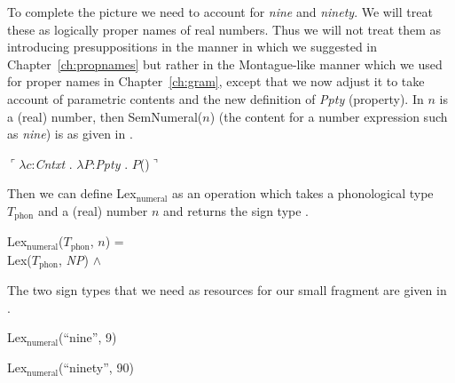 To complete the picture we need to account for \textit{nine} and
\textit{ninety}.  We will treat these as logically proper names of
real numbers.  Thus we will not treat them as introducing
presuppositions in the manner in which we suggested in
Chapter~\ref{ch:propnames} but rather in the Montague-like manner
which we used for proper names in Chapter~\ref{ch:gram}, except that
we now adjust it to take account of parametric contents and the new
definition of \textit{Ppty} (property).
In $n$ is a (real) number, then SemNumeral($n$) (the content for a
number expression such as \textit{nine}) is as given in
\nexteg{}.
\begin{ex} 
$\ulcorner\lambda c$:\textit{Cntxt} . $\lambda P$:\textit{Ppty} . $P$()$\urcorner$ 
\end{ex} 
Then we can define Lex$_{\mathrm{numeral}}$ as an operation which
takes a phonological type $T_{\mathrm{phon}}$ and a (real) number $n$
and returns the sign type \nexteg{}.
\begin{ex} 
Lex$_{\mathrm{numeral}}$($T_{\mathrm{phon}}$, $n$) = \\
\hspace*{1em}Lex($T_{\mathrm{phon}}$, \textit{NP}) \d{$\wedge$}   
\end{ex} 
The two sign types that we need as resources for our small fragment are given in
\nexteg{}.
\begin{ex} 
\begin{subex} 
 
\item Lex$_{\mathrm{numeral}}$(``nine'', 9) 
 
\item Lex$_{\mathrm{numeral}}$(``ninety'', 90)  
 
\end{subex} 
   
\end{ex}


